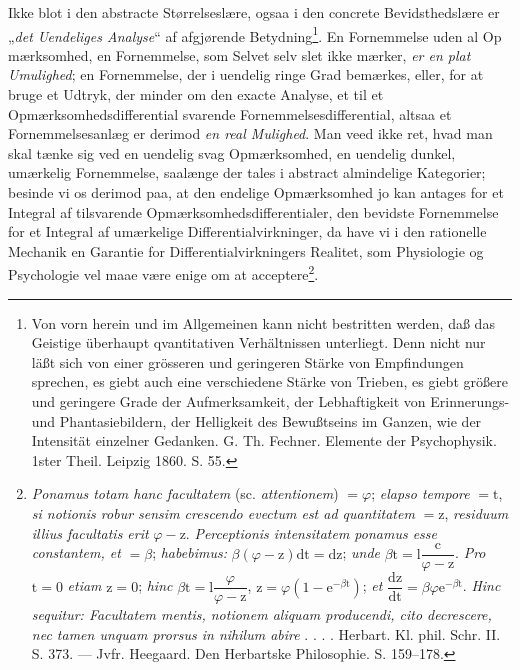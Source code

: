 \documentclass[11pt]{book}
\newcommand{\opage}[1]{\marginnote{\footnotesize\textit{[#1]}}}
\begin{document}
Ikke blot i den abstracte Størrelseslære, ogsaa i den concrete
Bevidsthedslære er „\emph{det Uendeliges Analyse}“ af afgjørende
Betydning\footnote{Von vorn herein und im Allgemeinen kann nicht
bestritten werden, daß das Geistige überhaupt qvantitativen
Verhältnissen unterliegt.
Denn nicht nur läßt sich von einer grösseren und geringeren Stärke
von Empfindungen sprechen, es giebt auch eine verschiedene Stärke von
Trieben, es giebt größere und geringere Grade der Aufmerksamkeit, der
Lebhaftigkeit von Erinnerungs- und Phantasiebildern, der Helligkeit
des Bewußtseins im Ganzen, wie der Intensität einzelner Gedanken.
G. Th. Fechner. Elemente der Psychophysik. 1ster Theil. Leipzig
1860. S. 55.}. En Fornemmelse uden al Op\-%
\opage{376} \setcounter{footnote}{0}%
mærksomhed, en Fornemmelse, som Selvet selv slet ikke mærker,
\emph{er en plat Umulighed}; en Fornemmelse, der i uendelig ringe
Grad bemærkes, eller, for at bruge et Udtryk, der minder om den
exacte Analyse, et til et Opmærksomhedsdifferential svarende
Fornemmelsesdifferential, altsaa et Fornemmelsesanlæg er derimod
\emph{en real Mulighed}. Man veed ikke ret, hvad man skal tænke sig
ved en uendelig svag Opmærksomhed, en uendelig dunkel, umærkelig
Fornemmelse, saalænge der tales i abstract almindelige Kategorier;
besinde vi os derimod paa, at den endelige Opmærksomhed jo kan
antages for et Integral af tilsvarende
Opmærksomhedsdifferentialer, den bevidste Fornemmelse for et Integral
af umærkelige Differentialvirkninger, da have vi i den rationelle
Mechanik en Garantie for Differentialvirkningers Realitet, som
Physiologie og Psychologie vel maae være enige om at
acceptere\footnote{\textit{Ponamus totam hanc facultatem}
(sc. \textit{attentionem}) $= \varphi$; \textit{elapso tempore}
$= \mathrm{t}$, \textit{si notionis robur sensim crescendo evectum est ad
quantitatem} $= \mathrm{z}$, \textit{residuum illius facultatis erit}
$\varphi - \mathrm{z}$. \textit{Perceptionis intensitatem ponamus esse
constantem, et} $= \beta$; \textit{habebimus:}
$\beta(\varphi - \mathrm{z})\mathrm{dt} = \mathrm{dz}$; \textit{unde}
$\beta\mathrm{t} = \mathrm{l}\dfrac{\mathrm{c}}{\varphi - \mathrm{z}}$.
\textit{Pro} $\mathrm{t} = 0$ \textit{etiam} $\mathrm{z} = 0$;
\textit{hinc}
$\beta\mathrm{t} = \mathrm{l}\dfrac{\varphi}{\varphi - \mathrm{z}}$,
$\mathrm{z} = \varphi(1 - \mathrm{e}^{-\beta\mathrm{t}})$; \textit{et}
$\dfrac{\mathrm{dz}}{\mathrm{dt}}
 = \beta\varphi\mathrm{e}^{-\beta\mathrm{t}}$. \textit{Hinc sequitur:
Facultatem mentis, notionem aliquam producendi, cito decrescere, nec
tamen unquam prorsus in nihilum abire} . . . . Herbart. Kl. phil.
Schr. II. S. 373. --- Jvfr. Heegaard. Den Herbartske Philosophie.
S. 159--178.}.
\end{document}
